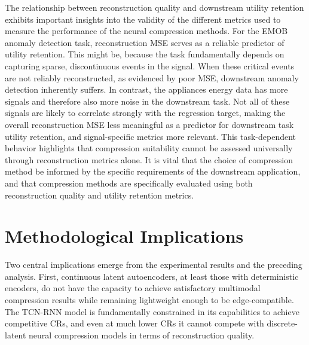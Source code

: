The relationship between reconstruction quality and downstream utility retention exhibits important insights into the validity of the different metrics used to measure the performance of the neural compression methods. For the EMOB anomaly detection task, reconstruction MSE serves as a reliable predictor of utility retention. This might be, because the task fundamentally depends on capturing sparse, discontinuous events in the signal. When these critical events are not reliably reconstructed, as evidenced by poor MSE, downstream anomaly detection inherently suffers. In contrast, the appliances energy data has more signals and therefore also more noise in the downstream task. Not all of these signals are likely to correlate strongly with the regression target, making the overall reconstruction MSE less meaningful as a predictor for downstream task utility retention, and signal-specific metrics more relevant. This task-dependent behavior highlights that compression suitability cannot be assessed universally through reconstruction metrics alone. It is vital that the choice of compression method be informed by the specific requirements of the downstream application, and that compression methods are specifically evaluated using both reconstruction quality and utility retention metrics.

\section{Methodological Implications}

Two central implications emerge from the experimental results and the preceding analysis. First, continuous latent autoencoders, at least those with deterministic encoders, do not have the capacity to achieve satisfactory multimodal compression results while remaining lightweight enough to be edge-compatible. The TCN-RNN model is fundamentally constrained in its capabilities to achieve competitive CRs, and even at much lower CRs it cannot compete with discrete-latent neural compression models in terms of reconstruction quality. 

